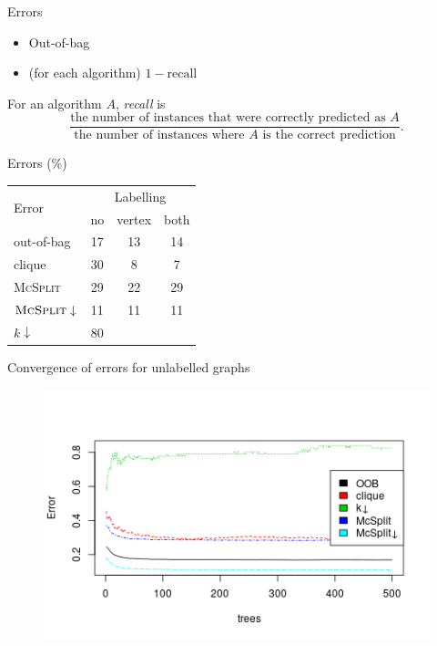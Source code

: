 \documentclass{beamer}
\begin{document}
\begin{frame}{Errors}
  \begin{itemize}
  \item Out-of-bag
  \item (for each algorithm) $1 - \text{recall}$
  \end{itemize}
  \begin{definition}
    For an algorithm $A$, \emph{recall} is
    \[ \frac{\text{the number of instances that were correctly predicted as
          $A$}}{\text{the number of instances where $A$ is the correct
          prediction}}. \]
  \end{definition}
\end{frame}

\begin{frame}{Errors (\%)}
  \centering
  \begin{tabular}{l | c c c}
    \multirow{2}{*}{Error} & \multicolumn{3}{c}{Labelling} \\
                           & no & vertex & both \\
    \hline
    out-of-bag & 17 & 13 & 14 \\
    clique & 30 & 8 & 7 \\
    \textsc{McSplit} & 29 & 22 & 29 \\
    $\textsc{McSplit}\downarrow$ & 11 & 11 & 11 \\
    $k\downarrow$ & 80 & &
  \end{tabular}
\end{frame}

\begin{frame}{Convergence of errors for unlabelled graphs}
  \begin{figure}
    \centering
    \includegraphics[scale=0.5]{../dissertation/images/unlabelled_forest_errors.png}
  \end{figure}
\end{frame}
\end{document}
